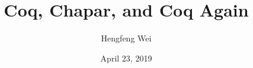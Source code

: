 \documentclass[]{beamer}
\title[Coq, Chapar, and Coq Again]{Coq, Chapar, and Coq Again}
\subtitle{}
\author[Hengfeng Wei]{Hengfeng Wei}
\institute{ICS, NJU}
\date{April 23, 2019}
\begin{document}
\renewcommand\figurename{} %
\renewcommand\tablename{}  %

\maketitle





\thankyou{}
\end{document}
